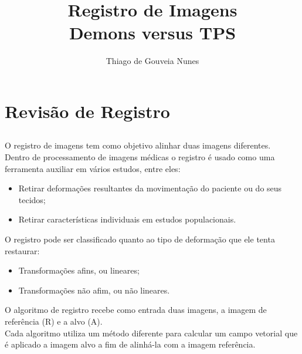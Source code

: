 \documentclass[t]{beamer}
\author{Thiago de Gouveia Nunes}
\title{Registro de Imagens\\ Demons versus TPS}
\institute{IME - USP}
\begin{document}
\graphicspath{{images/}}
\frame{\titlepage}

\section{Revisão de Registro}
\subsection{}

\begin{frame}
    O registro de imagens tem como objetivo alinhar duas imagens diferentes. \\
    Dentro de processamento de imagens médicas o registro é usado como uma ferramenta auxiliar em vários estudos, entre eles:
    \begin{itemize}
        \item Retirar deformações resultantes da movimentação do paciente ou do seus tecidos;
        \item Retirar características individuais em estudos populacionais.
    \end{itemize}
    O registro pode ser classificado quanto ao tipo de deformação que ele tenta restaurar:
    \begin{itemize}
        \item Transformações afins, ou lineares;
        \item Transformações não afim, ou não lineares.
    \end{itemize}
\end{frame}

\begin{frame}
    O algoritmo de registro recebe como entrada duas imagens, a imagem de referência (R) e a alvo (A). \\
    Cada algoritmo utiliza um método diferente para calcular um campo vetorial que é aplicado a imagem alvo a fim de alinhá-la
com a imagem referência.

\end{frame}
\end{document}
